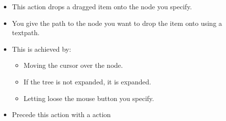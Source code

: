 
\begin{itemize}
\item This action drops a dragged item onto the node you specify. 
\item You give the path to the node you want to drop the item onto using a textpath. 
\item This is achieved by:
\begin{itemize}
\item Moving the cursor over the node.
\item If the tree is not expanded, it is expanded.
\item Letting loose the mouse button you specify. 
\end{itemize}
\item Precede this action with a  action
\end{itemize}
